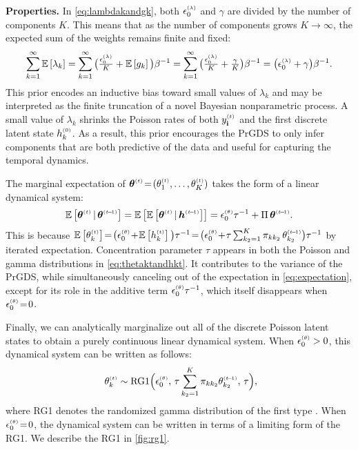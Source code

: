 \documentclass{article}
\begin{document}
\textbf{Properties.}
In \cref{eq:lambdakandgk}, both $\epslambda$ and $\gamma$ are divided by the number of components $K$. This means that as the number of components grows $K \!\rightarrow\! \infty$, the expected sum of the weights remains finite and fixed:~
\begin{equation}
\sum_{k=1}^\infty \E{\lambda_k} = \sum_{k=1}^\infty \big(\tfrac{\epslambda}{K} + \E{g_k}\big) \beta^{-1} = \sum_{k=1}^\infty \big(\tfrac{\epslambda}{K} + \tfrac{\gamma}{K} \big)\beta^{-1} = \big(\epslambda + \gamma \big)\beta^{-1}.
\end{equation}
This prior encodes an inductive bias toward small values of $\lambda_k$ and may be interpreted as the finite truncation of a novel Bayesian nonparametric process. A small value of $\lambda_k$ shrinks the Poisson rates of both $\ydt$ and the first discrete latent state $h^{\mathsmaller{(0)}}_k$. As a result, this prior encourages the PrGDS to only infer components that are both predictive of the data and useful for capturing the temporal dynamics.~

The marginal expectation of $\boldsymbol{\theta}^{\mathsmaller{(t)}} \teq (\theta^{\mathsmaller{(t)}}_{1},\ldots,\theta^{\mathsmaller{(t)}}_{K})$ takes the form of a linear dynamical system:~
\begin{align}
\label{eq:expectation}
\mathbb{E}\left[\boldsymbol{\theta}^{\mathsmaller{(t)}} \given \boldsymbol{\theta}^{\mathsmaller{(t \tm 1)}}\right] = \mathbb{E}\left[\mathbb{E}\left[\boldsymbol{\theta}^{\mathsmaller{(t)}} \given \boldsymbol{h}^{\mathsmaller{(t \tm 1)}}\right]\right] = \epstheta \tau^{-1} + \Pi \, \boldsymbol{\theta}^{\mathsmaller{(t \tm 1)}}.
\end{align}
This is because $\E{\thetakt} \teq \big(\epstheta \tp \E{\hkt}\big)\tau^{-1} \teq \big(\epstheta \tp \tau \sum_{k_2 = 1}^K \pi_{kk_2} \,\thetakttm \big) \tau^{-1}$ by iterated expectation. Concentration parameter $\tau$ appears in both the Poisson and gamma distributions in \cref{eq:thetaktandhkt}. It contributes to the variance of the PrGDS, while simultaneously canceling out of the expectation in \cref{eq:expectation}, except for its role in the additive term $\epstheta \tau^{-1}$, which itself disappears when $\epstheta \teq 0$.~

Finally, we can analytically marginalize out all of the discrete Poisson latent states to obtain a purely continuous linear dynamical system. When $\epstheta > 0$, this dynamical system can be written as follows:
\begin{equation}
\label{eq:rg1}
\
\thetakt \sim \textrm{RG1}\Big(\epstheta,\,\tau\sum_{k_2=1}^K \pi_{kk_2} \thetakttm,\, \tau\Big),
%
\end{equation}
where RG1 denotes the randomized gamma distribution of the first type \cite{yuan2000bessel,makarov2010exact}. When $\epstheta \teq 0$, the dynamical system can be written in terms of a limiting form of the RG1. We describe the RG1 in \cref{fig:rg1}.~
\end{document}
